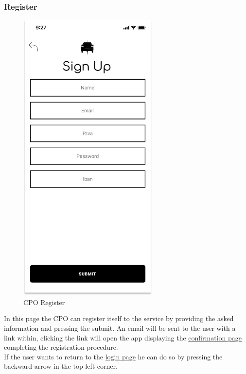 \subsubsection{Register}
\begin{figure}[H]
    \centering
    \includegraphics[keepaspectratio, height=15cm]{Mockup/CPOAppInterface/Register.png}
    \caption{\ac{CPO} Register}
    \label{site:Register}
\end{figure}
In this page the \ac{CPO} can register itself to the service by providing the asked information and pressing the submit. An email will be sent to the user with a link within, clicking the link will open the app displaying the \hyperref[site:ConfirmReg]{confirmation page} completing the registration procedure.\\
If the user wants to return to the \hyperref[fig:Login]{login page} he can do so by pressing the backward arrow in the top left corner.
